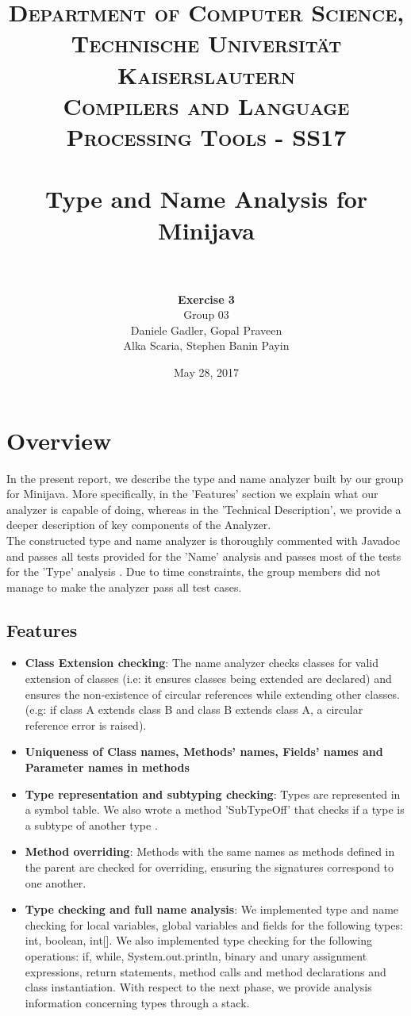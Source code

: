 \documentclass[paper=a4, fontsize=11pt]{scrartcl}
\title{
		\usefont{OT1}{bch}{b}{n}
		\normalfont \normalsize \textsc{Department of Computer Science, Technische Universit\"at Kaiserslautern\\
Compilers and Language Processing Tools - SS17
		} \\ [2pt]
		\horrule{0.5pt} \\[0.4cm]
		\huge Type and Name Analysis for Minijava\\
		\horrule{2pt} \\[0.5cm]
}
\author{	
		\textbf{Exercise 3}\\
		Group 03\\
        Daniele Gadler, Gopal Praveen\\Alka Scaria, Stephen Banin Payin \\[-1pt]		\normalsize
}
\date{May 28, 2017}
\numberwithin{equation}{section}		%
\numberwithin{figure}{section}			%
\numberwithin{table}{section}				%
\begin{document}
\maketitle

\section*{Overview}
In the present report, we describe the type and name analyzer built by our group for Minijava. 
More specifically, in the 'Features' section we explain what our analyzer is capable of doing, whereas in the 'Technical Description', we provide a deeper description of key components of the Analyzer.\\
The constructed type and name analyzer is thoroughly commented with Javadoc and passes all tests provided for the 'Name' analysis and passes most of the tests for the 'Type' analysis . Due to time constraints, the group members did not manage to make the analyzer pass all test cases. 

\subsection*{Features}

\begin{itemize}
 \item \textbf{Class Extension checking}: The name analyzer checks classes for valid extension of classes (i.e: it ensures classes being extended are declared) and ensures the non-existence of circular references while extending other classes. (e.g: if class A extends class B and class B extends class A, a circular reference error is raised). 
 \item \textbf{Uniqueness of Class names, Methods' names, Fields' names and Parameter names in methods }
 \item \textbf{Type representation and subtyping checking}: Types are represented in a symbol table. We also wrote a method 'SubTypeOff' that checks if a type is a subtype of another type \cite{Joseff}.
 \item \textbf{Method overriding}: Methods with the same names as methods defined in the parent are checked for overriding, ensuring the signatures correspond to one another. 
 \item \textbf{Type checking and full name analysis}: We implemented type and name checking for local variables, global variables and fields for the following types: int, boolean, int[]. We also implemented type checking for the following operations: if, while, System.out.println, binary and unary assignment expressions, return statements, method calls and method declarations and class instantiation. With respect to the next phase, we provide analysis information concerning types through a stack.
 
\end{itemize}
\end{document}
